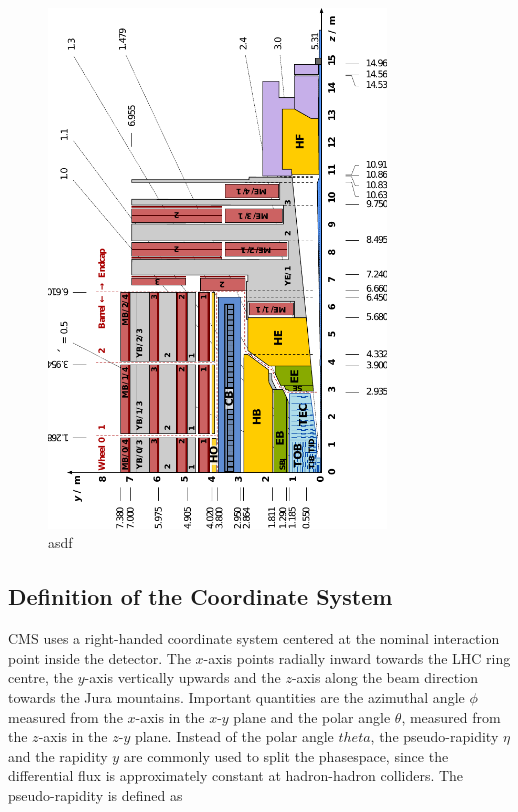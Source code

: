 \begin{figure}[htb]
    \centering
    \includegraphics[width=0.8\textwidth]{figures/cms_detector/cms_longitudinal_section.pdf}
    \caption[Longitudinal section of the CMS detector]{asdf}
    \label{fig:cms:longitudinal_section}
\end{figure}


\subsection{Definition of the Coordinate System}

CMS uses a right-handed coordinate system centered at the nominal interaction point inside the
detector. The $x$-axis points radially inward towards the LHC ring centre, the
$y$-axis vertically upwards and the $z$-axis along the beam direction towards
the Jura mountains. Important quantities are the azimuthal angle $\phi$
measured from the $x$-axis in the $x$-$y$ plane and the polar angle $\theta$,
measured from the $z$-axis in the $z$-$y$ plane. Instead of the polar angle
$theta$, the pseudo-rapidity $\eta$ and the rapidity $y$ are commonly used to
split the phasespace, since the differential flux is approximately constant at
hadron-hadron colliders. The pseudo-rapidity is defined as

